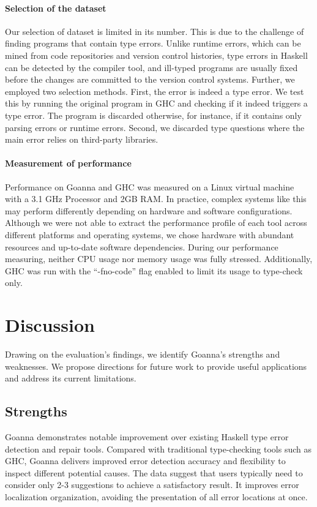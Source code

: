     \paragraph{\textbf{Selection of the dataset}}
    Our selection of dataset is limited in its number. This is due to the challenge of finding programs that contain type errors. Unlike runtime errors, which can be mined from code repositories and version control histories, type errors in Haskell can be detected by the compiler tool, and ill-typed programs are usually fixed before the changes are committed to the version control systems. Further, we employed two selection methods. First, the error is indeed a type error. We test this by running the original program in GHC and checking if it indeed triggers a type error. The program is discarded otherwise, for instance, if it contains only parsing errors or runtime errors. Second, we discarded type questions where the main error relies on third-party libraries. 
    
  
        
    \paragraph{\textbf{Measurement of performance}} Performance on Goanna and GHC was measured on a Linux virtual machine with a 3.1 GHz Processor and 2GB RAM. In practice, complex systems like this may perform differently depending on hardware and software configurations. Although we were not able to extract the performance profile of each tool across different platforms and operating systems, we chose hardware with abundant resources and up-to-date software dependencies. During our performance measuring, neither CPU usage nor memory usage was fully stressed. Additionally, GHC was run with the ``-fno-code'' flag enabled to limit its usage to type-check only.


    \section{Discussion} \label{sec:discussion}

    Drawing on the evaluation's findings, we identify Goanna's strengths and weaknesses. We propose directions for future work to provide useful applications and address its current limitations.

    \subsection{Strengths}
    Goanna demonstrates notable improvement over existing Haskell type error detection and repair tools. Compared with traditional type-checking tools such as GHC, Goanna delivers improved error detection accuracy and flexibility to inspect different potential causes. The data suggest that users typically need to consider only 2-3 suggestions to achieve a satisfactory result. It improves error localization organization, avoiding the presentation of all error locations at once.



